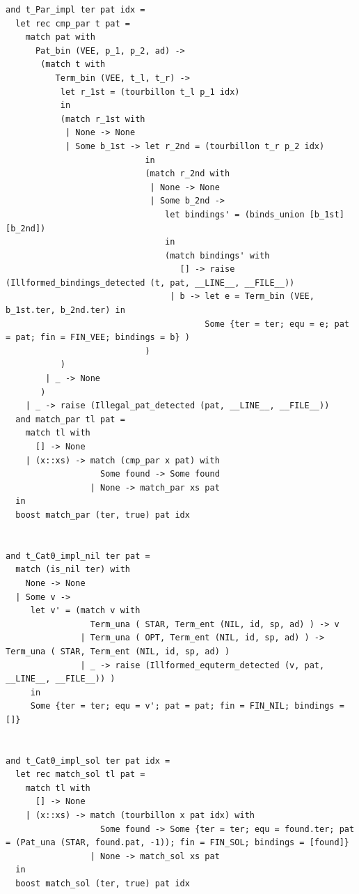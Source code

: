 \documentclass[12pt]{article}
\begin{document}
\begin{tiny}
\begin{verbatim}
and t_Par_impl ter pat idx =
  let rec cmp_par t pat =
    match pat with
      Pat_bin (VEE, p_1, p_2, ad) ->
       (match t with
          Term_bin (VEE, t_l, t_r) ->
           let r_1st = (tourbillon t_l p_1 idx)
           in
           (match r_1st with
            | None -> None
            | Some b_1st -> let r_2nd = (tourbillon t_r p_2 idx)
                            in
                            (match r_2nd with
                             | None -> None
                             | Some b_2nd ->
                                let bindings' = (binds_union [b_1st] [b_2nd])
                                in
                                (match bindings' with
                                   [] -> raise (Illformed_bindings_detected (t, pat, __LINE__, __FILE__))
                                 | b -> let e = Term_bin (VEE, b_1st.ter, b_2nd.ter) in
                                        Some {ter = ter; equ = e; pat = pat; fin = FIN_VEE; bindings = b} )
                            )
           )
        | _ -> None
       )
    | _ -> raise (Illegal_pat_detected (pat, __LINE__, __FILE__))
  and match_par tl pat =
    match tl with
      [] -> None
    | (x::xs) -> match (cmp_par x pat) with
                   Some found -> Some found
                 | None -> match_par xs pat
  in
  boost match_par (ter, true) pat idx


and t_Cat0_impl_nil ter pat =
  match (is_nil ter) with
    None -> None
  | Some v ->
     let v' = (match v with
                 Term_una ( STAR, Term_ent (NIL, id, sp, ad) ) -> v
               | Term_una ( OPT, Term_ent (NIL, id, sp, ad) ) -> Term_una ( STAR, Term_ent (NIL, id, sp, ad) )
               | _ -> raise (Illformed_equterm_detected (v, pat, __LINE__, __FILE__)) )
     in
     Some {ter = ter; equ = v'; pat = pat; fin = FIN_NIL; bindings = []}


and t_Cat0_impl_sol ter pat idx =
  let rec match_sol tl pat =
    match tl with
      [] -> None
    | (x::xs) -> match (tourbillon x pat idx) with
                   Some found -> Some {ter = ter; equ = found.ter; pat = (Pat_una (STAR, found.pat, -1)); fin = FIN_SOL; bindings = [found]}
                 | None -> match_sol xs pat
  in
  boost match_sol (ter, true) pat idx



\end{verbatim}
\end{tiny}
\end{document}

